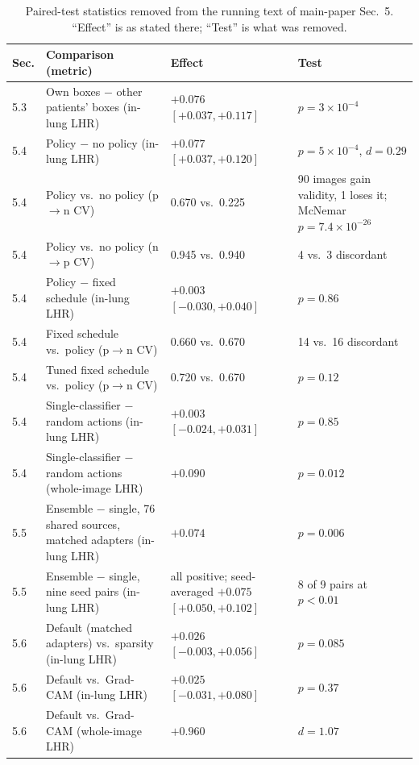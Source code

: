 \begin{table}[t]
\centering
\caption{Paired-test statistics removed from the running text of main-paper Sec.~5. ``Effect'' is as stated there; ``Test'' is what was removed.}
\label{tab:suppl-paired-tests}
\footnotesize
\begin{tabular}{@{}l p{} p{} p{}@{}}
\toprule
Sec. & Comparison (metric) & Effect & Test \\
\midrule
5.3 & Own boxes $-$ other patients' boxes (in-lung LHR) & $+0.076$ $[+0.037, +0.117]$ & $p=3\times10^{-4}$ \\
5.4 & Policy $-$ no policy (in-lung LHR) & $+0.077$ $[+0.037, +0.120]$ & $p=5\times10^{-4}$, $d=0.29$ \\
5.4 & Policy vs.\ no policy (p$\to$n CV) & 0.670 vs.\ 0.225 & 90 images gain validity, 1 loses it; McNemar $p=7.4\times10^{-26}$ \\
5.4 & Policy vs.\ no policy (n$\to$p CV) & 0.945 vs.\ 0.940 & 4 vs.\ 3 discordant \\
5.4 & Policy $-$ fixed schedule (in-lung LHR) & $+0.003$ $[-0.030, +0.040]$ & $p=0.86$ \\
5.4 & Fixed schedule vs.\ policy (p$\to$n CV) & 0.660 vs.\ 0.670 & 14 vs.\ 16 discordant \\
5.4 & Tuned fixed schedule vs.\ policy (p$\to$n CV) & 0.720 vs.\ 0.670 & $p=0.12$ \\
5.4 & Single-classifier $-$ random actions (in-lung LHR) & $+0.003$ $[-0.024, +0.031]$ & $p=0.85$ \\
5.4 & Single-classifier $-$ random actions (whole-image LHR) & $+0.090$ & $p=0.012$ \\
5.5 & Ensemble $-$ single, 76 shared sources, matched adapters (in-lung LHR) & $+0.074$ & $p=0.006$ \\
5.5 & Ensemble $-$ single, nine seed pairs (in-lung LHR) & all positive; seed-averaged $+0.075$ $[+0.050, +0.102]$ & 8 of 9 pairs at $p<0.01$ \\
5.6 & Default (matched adapters) vs.\ sparsity (in-lung LHR) & $+0.026$ $[-0.003, +0.056]$ & $p=0.085$ \\
5.6 & Default vs.\ Grad-CAM (in-lung LHR) & $+0.025$ $[-0.031, +0.080]$ & $p=0.37$ \\
5.6 & Default vs.\ Grad-CAM (whole-image LHR) & $+0.960$ & $d=1.07$ \\
\bottomrule
\end{tabular}
\end{table}
